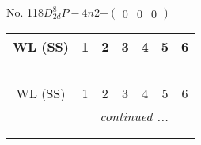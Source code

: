 \documentclass[fleqn,9pt,landscape]{jsarticle}
\begin{document}
\newpage
No. 118\quad$D_{2d}^{8}$\quad$P-4n2$\quad[ tetragonal ]\quad$+\begin{pmatrix} 0 & 0 & 0 \end{pmatrix}$
\begin{center}
\renewcommand{\arraystretch}{1.2}
\begin{longtable}{ccccccc}
 \hline \hline
WL (SS) & 1 & 2 & 3 & 4 & 5 & 6 \\ \hline \endfirsthead

\multicolumn{6}{l}{\tablename\ \thetable{}} \\
 \hline \hline
WL (SS) & 1 & 2 & 3 & 4 & 5 & 6 \\ \hline \endhead

 \hline \hline
\multicolumn{6}{r}{\footnotesize\it continued ...} \\ \endfoot

 \hline \hline
\multicolumn{6}{r}{} \\ \endlastfoot


\end{longtable}
\end{center}
\end{document}
